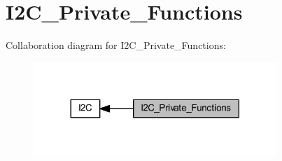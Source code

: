 \hypertarget{group___i2_c___private___functions}{}\section{I2\+C\+\_\+\+Private\+\_\+\+Functions}
\label{group___i2_c___private___functions}
Collaboration diagram for I2\+C\+\_\+\+Private\+\_\+\+Functions\+:
\nopagebreak
\begin{figure}[H]
\begin{center}
\leavevmode
\includegraphics[width=260pt]{group___i2_c___private___functions}
\end{center}
\end{figure}
